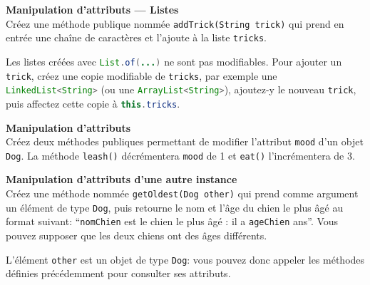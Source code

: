 \begin{Exercice}[5 minutes] \textbf{Manipulation d'attributs — Listes}\\
    Créez une méthode publique nommée \lstinline{addTrick(String trick)} qui prend en entrée une chaîne de caractères et l'ajoute à la liste \lstinline{tricks}. \\
   	
\begin{conseil}
  Les listes créées avec \lstinline[language=Java]{List.of(...)} ne sont pas modifiables. Pour ajouter un \lstinline{trick}, créez une copie modifiable de \lstinline{tricks}, par exemple une \lstinline[language=Java]{LinkedList<String>} (ou une \lstinline[language=Java]{ArrayList<String>}), ajoutez-y le nouveau \texttt{trick}, puis affectez cette copie à \lstinline[language=Java]{this.tricks}.
\end{conseil}
    
\begin{solution}
	
\end{solution}
\end{Exercice}

\begin{Exercice}[5 minutes] \textbf{Manipulation d'attributs}\\
    Créez deux méthodes publiques permettant de modifier l'attribut \lstinline{mood} d'un objet \lstinline{Dog}. La méthode \lstinline{leash()} décrémentera \lstinline{mood} de 1 et \lstinline{eat()} l'incrémentera de 3. \\

\begin{solution}
	
\end{solution}
\end{Exercice}

\begin{Exercice}[5 minutes] \textbf{Manipulation d'attributs d'une autre instance}\\
    Créez une méthode nommée \lstinline{getOldest(Dog other)} qui prend comme argument un élément de type \lstinline{Dog}, puis retourne le nom et l'âge du chien le plus âgé au format suivant: ``\lstinline{nomChien} est le chien le plus âgé : il a \lstinline{ageChien} ans''. Vous pouvez supposer que les deux chiens ont des âges différents. \\
   	
\begin{conseil}
   L'élément \lstinline{other} est un objet de type \lstinline{Dog}: vous pouvez donc appeler les méthodes définies précédemment pour consulter ses attributs.
\end{conseil}
    
\begin{solution}
	
\end{solution}
\end{Exercice}

